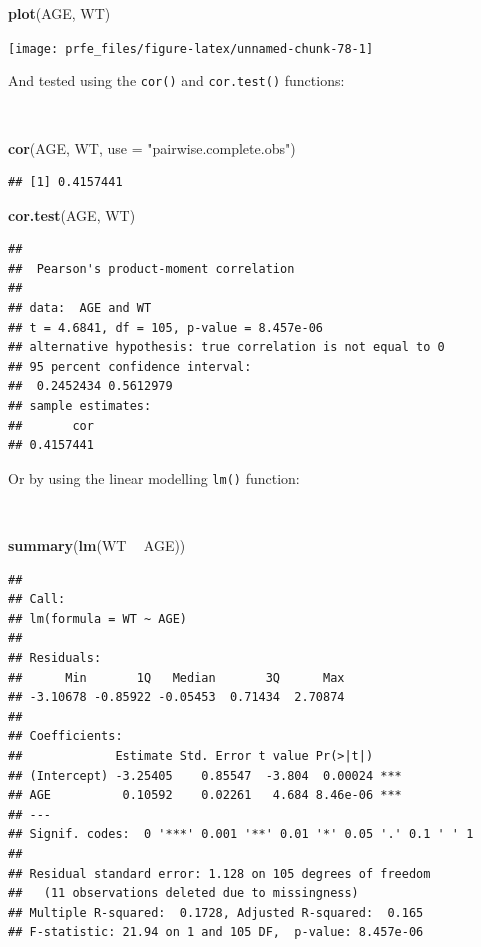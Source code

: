 \documentclass[12pt,a4paper]{book}
\newenvironment{Shaded}{\begin{snugshade}}{\end{snugshade}}
\newcommand{\DataTypeTok}[1]{\textcolor[rgb]{0.13,0.29,0.53}{#1}}
\newcommand{\KeywordTok}[1]{\textcolor[rgb]{0.13,0.29,0.53}{\textbf{#1}}}
\newcommand{\NormalTok}[1]{#1}
\newcommand{\OperatorTok}[1]{\textcolor[rgb]{0.81,0.36,0.00}{\textbf{#1}}}
\newcommand{\StringTok}[1]{\textcolor[rgb]{0.31,0.60,0.02}{#1}}
\theoremstyle{definition}
\theoremstyle{definition}
\theoremstyle{definition}
\theoremstyle{remark}
\begin{document}
\begin{Shaded}
\begin{Highlighting}[]
\KeywordTok{plot}\NormalTok{(AGE, WT)}
\end{Highlighting}
\end{Shaded}

\begin{center}\texttt{[image: prfe\_files/figure-latex/unnamed-chunk-78-1]} \end{center}

\newpage

And tested using the \texttt{cor()} and \texttt{cor.test()} functions:

~

\begin{Shaded}
\begin{Highlighting}[]
\KeywordTok{cor}\NormalTok{(AGE, WT, }\DataTypeTok{use =} \StringTok{"pairwise.complete.obs"}\NormalTok{)}
\end{Highlighting}
\end{Shaded}

\begin{verbatim}
## [1] 0.4157441
\end{verbatim}

\begin{Shaded}
\begin{Highlighting}[]
\KeywordTok{cor.test}\NormalTok{(AGE, WT)}
\end{Highlighting}
\end{Shaded}

\begin{verbatim}
## 
##  Pearson's product-moment correlation
## 
## data:  AGE and WT
## t = 4.6841, df = 105, p-value = 8.457e-06
## alternative hypothesis: true correlation is not equal to 0
## 95 percent confidence interval:
##  0.2452434 0.5612979
## sample estimates:
##       cor 
## 0.4157441
\end{verbatim}

\newpage

Or by using the linear modelling \texttt{lm()} function:

~

\begin{Shaded}
\begin{Highlighting}[]
\KeywordTok{summary}\NormalTok{(}\KeywordTok{lm}\NormalTok{(WT }\OperatorTok{~}\StringTok{ }\NormalTok{AGE))}
\end{Highlighting}
\end{Shaded}

\begin{verbatim}
## 
## Call:
## lm(formula = WT ~ AGE)
## 
## Residuals:
##      Min       1Q   Median       3Q      Max 
## -3.10678 -0.85922 -0.05453  0.71434  2.70874 
## 
## Coefficients:
##             Estimate Std. Error t value Pr(>|t|)    
## (Intercept) -3.25405    0.85547  -3.804  0.00024 ***
## AGE          0.10592    0.02261   4.684 8.46e-06 ***
## ---
## Signif. codes:  0 '***' 0.001 '**' 0.01 '*' 0.05 '.' 0.1 ' ' 1
## 
## Residual standard error: 1.128 on 105 degrees of freedom
##   (11 observations deleted due to missingness)
## Multiple R-squared:  0.1728, Adjusted R-squared:  0.165 
## F-statistic: 21.94 on 1 and 105 DF,  p-value: 8.457e-06
\end{verbatim}
\end{document}
